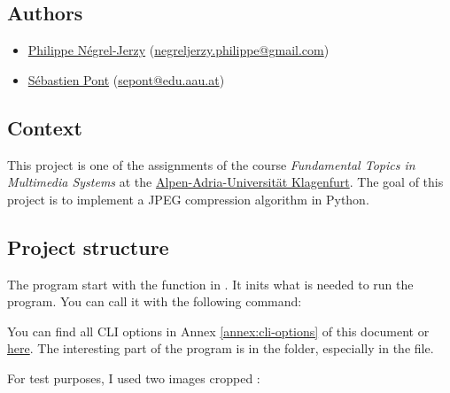 \subsection{Authors}

\begin{itemize}
    \item \href{https://github.com/BSoDium}{Philippe Négrel-Jerzy} (\href{mailto:negreljerzy.philippe@gmail.com}{negreljerzy.philippe@gmail.com})
    \item \href{https://github.com/seba1204}{Sébastien Pont} (\href{mailto:sepont@edu.aau.at}{sepont@edu.aau.at})
\end{itemize}

\subsection{Context}

This project is one of the assignments of the course \textit{Fundamental Topics in Multimedia Systems} at the \href{https://www.aau.at/en/}{Alpen-Adria-Universität Klagenfurt}.
The goal of this project is to implement a JPEG compression algorithm in Python.

\subsection{Project structure}




The program start with the  function in .
It inits what is needed to run the program. You can call it with the following command:


You can find all CLI options in Annex \ref{annex:cli-options} of this document
or \href{https://github.com/seba1204/jpeg-compressor/wiki}{here}.
The interesting part of the program is in the  folder,
especially in the  file.

For test purposes, I used two images cropped :

